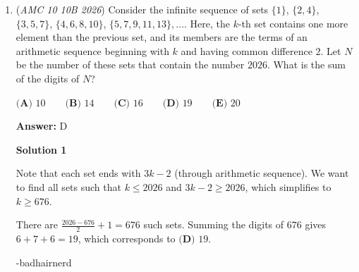\begin{enumerate}
 Expanding and simplifying $\textcircled{1}$, we have:

 
 \[x^2 + y^2 = x^2 - 6x + 9 + y^2\]
 \[x^2 = x^2 - 6x + 9\]
 \[6x = 9\]
 \[x = \frac{3}{2}\]

 Plugging the $x$ value into $\textcircled{2}$, we have:

 
 \[(\frac{3}{2} - 3)^2 + y^2 = (\frac{3}{2})^2 + (y-4)^2\]
 \[(-\frac{3}{2})^2 + y^2 = (\frac{3}{2})^2 + (y-4)^2\]
 \[y^2 = y^2 - 8y + 16\]
 \[8y = 16\]
 \[y = 2\]

 Hence, the center of the circle $P$ has coordinates $(\frac{3}{2}, 2)$.

 Using the distance formula above, we find the radius $r$ of the circle:

 
 \[r = \sqrt{(\frac{3}{2})^2 + (2)^2}\]
 \[r = \sqrt{\frac{9}{4} + 4}\]
 \[r = \sqrt{\frac{25}{4}}\]
 \[r = \frac{5}{2}\]

 Plugging the above values into the circle formula and simplifying, we have:
 \[(x - \frac{3}{2})^2 + (y - 2)^2 = \frac{25}{4}\]
 \[x^2 - 3x + \frac{9}{4} + y^2 - 4y + 4 = \frac{25}{4}\]
 \[x^2 + y^2 - 3x - 4y = 0\]

 Hence, $a + b + c = -3 + (-4) + 0 = \boxed{\textbf{(A)}-7}$.

 


	\item (\textit{AMC 10 10B 2026}) Consider the infinite sequence of sets $\{1\}$, $\{2, 4\}$, $\{3, 5, 7\}$, $\{4, 6, 8, 10\}$, $\{5, 7, 9, 11, 13\}, \dots$. Here, the $k$-th set contains one more element than the previous set, and its members are the terms of an arithmetic sequence beginning with $k$ and having common difference $2$. Let $N$ be the number of these sets that contain the number $2026$. What is the sum of the digits of $N$?


 $\textbf{(A) } 10 \qquad \textbf{(B) } 14 \qquad \textbf{(C) } 16 \qquad \textbf{(D) } 19 \qquad \textbf{(E) } 20$

 \textbf{Answer: }D



\textbf{Solution 1}

Note that each set ends with $3k - 2$ (through arithmetic sequence). We want to find all sets such that $k \le 2026$ and $3k - 2 \ge 2026$, which simplifies to $k \ge 676$.

 There are $\frac{2026 - 676}{2} + 1 = 676$ such sets. Summing the digits of $676$ gives $6 + 7 + 6 = 19$, which corresponds to $\boxed{\textbf{(D) } 19}$.

 
-badhairnerd


\end{enumerate}
